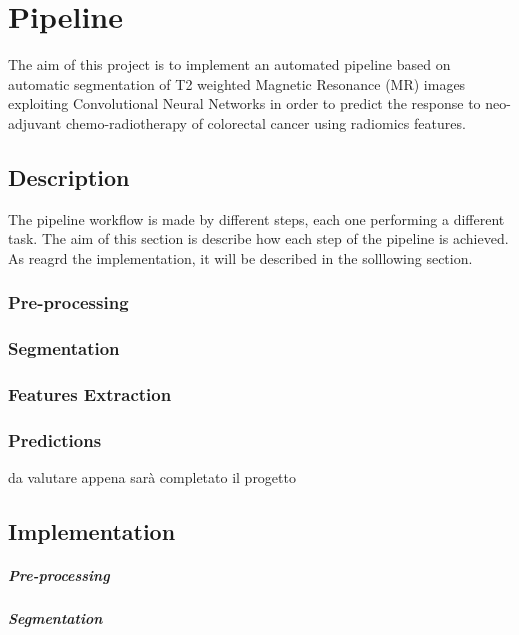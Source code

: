 \documentclass[12pt,a4paper]{report}
\begin{document}
\chapter{Pipeline}

The aim of this project is to implement an automated pipeline based on automatic segmentation of T2 weighted Magnetic Resonance (MR) images exploiting Convolutional Neural Networks in order to predict the response to neo-adjuvant chemo-radiotherapy of colorectal cancer using radiomics features. 

\section{Description}

The pipeline workflow is made by different steps, each one performing a different task. The aim of this section is describe how each step of the pipeline is achieved. As reagrd the implementation, it will be described in the solllowing section.


\subsection{Pre-processing}

\subsection{Segmentation}

\subsection{Features Extraction}

\subsection{Predictions}

da valutare appena sarà completato il progetto

\section{Implementation}


\paragraph{Pre-processing}
\paragraph{Segmentation}
\end{document}

